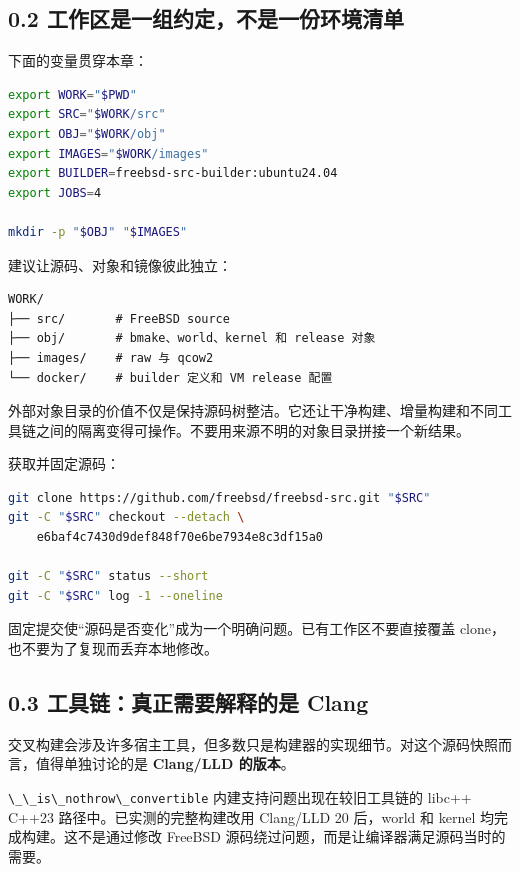 \documentclass[
  11pt,
  UTF8,
  a4paper,
  fontset=fandol]{ctexart}
\newcommand{\passthrough}[1]{#1}
\begin{document}
\subsection{0.2
工作区是一组约定，不是一份环境清单}\label{ux5de5ux4f5cux533aux662fux4e00ux7ec4ux7ea6ux5b9aux4e0dux662fux4e00ux4efdux73afux5883ux6e05ux5355}

下面的变量贯穿本章：

\begin{lstlisting}[language=sh]
export WORK="$PWD"
export SRC="$WORK/src"
export OBJ="$WORK/obj"
export IMAGES="$WORK/images"
export BUILDER=freebsd-src-builder:ubuntu24.04
export JOBS=4

mkdir -p "$OBJ" "$IMAGES"
\end{lstlisting}

建议让源码、对象和镜像彼此独立：

\begin{lstlisting}
WORK/
├── src/       # FreeBSD source
├── obj/       # bmake、world、kernel 和 release 对象
├── images/    # raw 与 qcow2
└── docker/    # builder 定义和 VM release 配置
\end{lstlisting}

外部对象目录的价值不仅是保持源码树整洁。它还让干净构建、增量构建和不同工具链之间的隔离变得可操作。不要用来源不明的对象目录拼接一个新结果。

获取并固定源码：

\begin{lstlisting}[language=sh]
git clone https://github.com/freebsd/freebsd-src.git "$SRC"
git -C "$SRC" checkout --detach \
    e6baf4c7430d9def848f70e6be7934e8c3df15a0

git -C "$SRC" status --short
git -C "$SRC" log -1 --oneline
\end{lstlisting}

固定提交使``源码是否变化''成为一个明确问题。已有工作区不要直接覆盖
clone，也不要为了复现而丢弃本地修改。

\subsection{0.3 工具链：真正需要解释的是
Clang}\label{ux5de5ux5177ux94feux771fux6b63ux9700ux8981ux89e3ux91caux7684ux662f-clang}

交叉构建会涉及许多宿主工具，但多数只是构建器的实现细节。对这个源码快照而言，值得单独讨论的是
\textbf{Clang/LLD 的版本}。

\passthrough{\lstinline!\_\_is\_nothrow\_convertible!}
内建支持问题出现在较旧工具链的 libc++ C++23 路径中。已实测的完整构建改用
Clang/LLD 20 后，world 和 kernel 均完成构建。这不是通过修改 FreeBSD
源码绕过问题，而是让编译器满足源码当时的需要。
\end{document}
